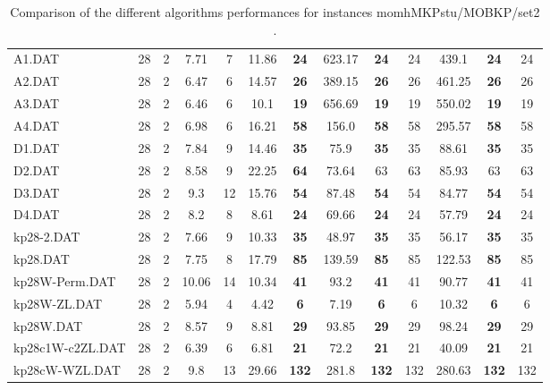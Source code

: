 \begin{table}[h]
{\begin{tabular}{lcccccccccccc}
A1.DAT & 28 & 2 &  \textcolor{blue2}{7.71} & 7 & 11.86 &  \textbf{24} & 623.17 &  \textbf{24} & 24 & 439.1 &  \textbf{24} & 24 \\
A2.DAT & 28 & 2 &  \textcolor{blue2}{6.47} & 6 & 14.57 &  \textbf{26} & 389.15 &  \textbf{26} & 26 & 461.25 &  \textbf{26} & 26 \\
A3.DAT & 28 & 2 &  \textcolor{blue2}{6.46} & 6 & 10.1 &  \textbf{19} & 656.69 &  \textbf{19} & 19 & 550.02 &  \textbf{19} & 19 \\
A4.DAT & 28 & 2 &  \textcolor{blue2}{6.98} & 6 & 16.21 &  \textbf{58} & 156.0 &  \textbf{58} & 58 & 295.57 &  \textbf{58} & 58 \\
D1.DAT & 28 & 2 &  \textcolor{blue2}{7.84} & 9 & 14.46 &  \textbf{35} & 75.9 &  \textbf{35} & 35 & 88.61 &  \textbf{35} & 35 \\
D2.DAT & 28 & 2 &  \textcolor{blue2}{8.58} & 9 & 22.25 &  \textbf{64} & 73.64 & 63 & 63 & 85.93 & 63 & 63 \\
D3.DAT & 28 & 2 &  \textcolor{blue2}{9.3} & 12 & 15.76 &  \textbf{54} & 87.48 &  \textbf{54} & 54 & 84.77 &  \textbf{54} & 54 \\
D4.DAT & 28 & 2 &  \textcolor{blue2}{8.2} & 8 & 8.61 &  \textbf{24} & 69.66 &  \textbf{24} & 24 & 57.79 &  \textbf{24} & 24 \\
kp28-2.DAT & 28 & 2 &  \textcolor{blue2}{7.66} & 9 & 10.33 &  \textbf{35} & 48.97 &  \textbf{35} & 35 & 56.17 &  \textbf{35} & 35 \\
kp28.DAT & 28 & 2 &  \textcolor{blue2}{7.75} & 8 & 17.79 &  \textbf{85} & 139.59 &  \textbf{85} & 85 & 122.53 &  \textbf{85} & 85 \\
kp28W-Perm.DAT & 28 & 2 &  \textcolor{blue2}{10.06} & 14 & 10.34 &  \textbf{41} & 93.2 &  \textbf{41} & 41 & 90.77 &  \textbf{41} & 41 \\
kp28W-ZL.DAT & 28 & 2 & 5.94 & 4 &  \textcolor{blue2}{4.42} &  \textbf{6} & 7.19 &  \textbf{6} & 6 & 10.32 &  \textbf{6} & 6 \\
kp28W.DAT & 28 & 2 &  \textcolor{blue2}{8.57} & 9 & 8.81 &  \textbf{29} & 93.85 &  \textbf{29} & 29 & 98.24 &  \textbf{29} & 29 \\
kp28c1W-c2ZL.DAT & 28 & 2 &  \textcolor{blue2}{6.39} & 6 & 6.81 &  \textbf{21} & 72.2 &  \textbf{21} & 21 & 40.09 &  \textbf{21} & 21 \\
kp28cW-WZL.DAT & 28 & 2 &  \textcolor{blue2}{9.8} & 13 & 29.66 &  \textbf{132} & 281.8 &  \textbf{132} & 132 & 280.63 &  \textbf{132} & 132 \\
\bottomrule
\end{tabular}
}%
\caption{Comparison of the different algorithms performances for instances momhMKPstu/MOBKP/set2 .}
\label{tab:table_compare_momhMKPstu/MOBKP/set2 }
\end{table}
